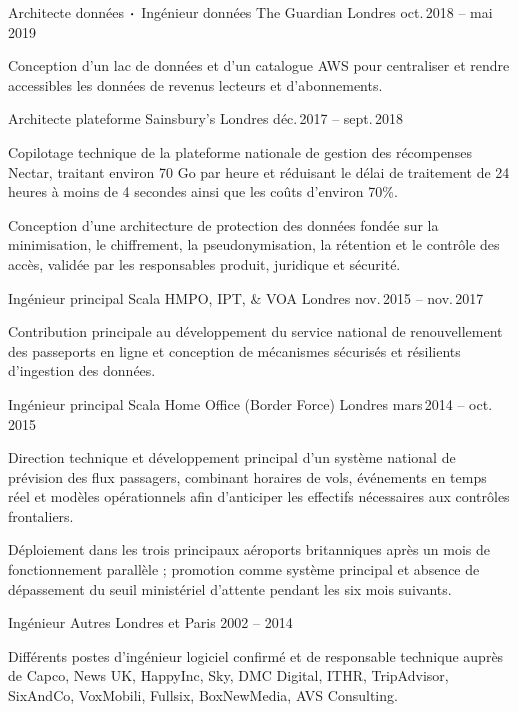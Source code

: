 \begin{cventries}
    \cventry
    {Architecte données$\sqbig$Ingénieur données}
    {The Guardian}
    {Londres}
    {oct.\,2018 -- mai\,2019}
    {
        \begin{cvitems}
            \item {Conception d’un lac de données et d’un catalogue AWS pour centraliser et rendre accessibles les données de revenus lecteurs et d’abonnements.}
        \end{cvitems}
    }

    \cventry
    {Architecte plateforme}
    {Sainsbury's}
    {Londres}
    {déc.\,2017 -- sept.\,2018}
    {
        \begin{cvitems}
            \item {Copilotage technique de la plateforme nationale de gestion des récompenses Nectar, traitant environ 70 Go par heure et réduisant le délai de traitement de 24 heures à moins de 4 secondes ainsi que les coûts d’environ 70\%.}
            \item {Conception d’une architecture de protection des données fondée sur la minimisation, le chiffrement, la pseudonymisation, la rétention et le contrôle des accès, validée par les responsables produit, juridique et sécurité.}
        \end{cvitems}
    }

    \cventry
    {Ingénieur principal Scala}
    {HMPO, IPT, \& VOA}
    {Londres}
    {nov.\,2015 -- nov.\,2017}
    {
        \begin{cvitems}
            \item {Contribution principale au développement du service national de renouvellement des passeports en ligne et conception de mécanismes sécurisés et résilients d’ingestion des données.}
        \end{cvitems}
    }

    \cventry
    {Ingénieur principal Scala}
    {Home Office (Border Force)}
    {Londres}
    {mars\,2014 -- oct.\,2015}
    {
        \begin{cvitems}
            \item {Direction technique et développement principal d’un système national de prévision des flux passagers, combinant horaires de vols, événements en temps réel et modèles opérationnels afin d’anticiper les effectifs nécessaires aux contrôles frontaliers.}
            \item {Déploiement dans les trois principaux aéroports britanniques après un mois de fonctionnement parallèle ; promotion comme système principal et absence de dépassement du seuil ministériel d’attente pendant les six mois suivants.}
        \end{cvitems}
    }

    \cventry
    {Ingénieur}
    {Autres}
    {Londres et Paris}
    {2002 -- 2014}
    {
        \begin{cvitems}
            \item {Différents postes d’ingénieur logiciel confirmé et de responsable technique auprès de Capco, News UK, HappyInc, Sky, DMC Digital, ITHR, TripAdvisor, SixAndCo, VoxMobili, Fullsix, BoxNewMedia, AVS Consulting.}
        \end{cvitems}
    }

\end{cventries}